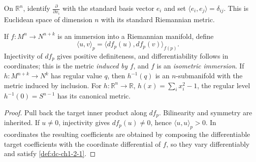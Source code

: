 \begin{example}
  \label{ex:dc-ch1-2-4}


  On $\mathbb{R}^n$, identify $\frac{\partial}{\partial x_i}$ with the standard
  basis vector $e_i$ and set $\langle e_i,e_j\rangle=\delta_{ij}$. This is
  Euclidean space of dimension $n$ with its standard Riemannian metric.
\end{example}

\begin{example}
  \label{ex:dc-ch1-2-5}


  If $f:M^n\to N^{n+k}$ is an immersion into a Riemannian manifold, define
  $$
  \langle u,v\rangle_p=\langle df_p(u),df_p(v)\rangle_{f(p)}.
  $$
  Injectivity of $df_p$ gives positive definiteness, and differentiability follows
  in coordinates; this is the metric \emph{induced by $f$}, and $f$ is an
  \emph{isometric immersion}. If $h:M^{n+k}\to N^k$ has regular value $q$, then
  $h^{-1}(q)$ is an $n$-submanifold with the metric induced by inclusion. For
  $h:\mathbb{R}^n\to\mathbb{R}$, $h(x)=\sum_i x_i^2-1$, the regular level
  $h^{-1}(0)=S^{n-1}$ has its canonical metric.
\end{example}
\begin{proof}

  \sketch
  Pull back the target inner product along $df_p$. Bilinearity and symmetry are
  inherited. If $u\ne0$, injectivity gives $df_p(u)\ne0$, hence
  $\langle u,u\rangle_p>0$. In coordinates the resulting coefficients are obtained
  by composing the differentiable target coefficients with the coordinate
  differential of $f$, so they vary differentiably and satisfy
  \cref{def:dc-ch1-2-1}.
\end{proof}


